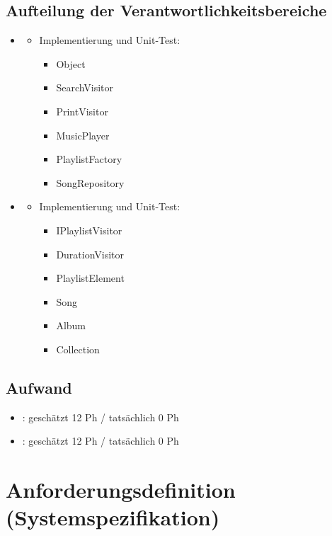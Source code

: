 \subsection{Aufteilung der Verantwortlichkeitsbereiche}
\begin{itemize}
	\item \docauthor
	\begin{itemize}
		\item Implementierung und Unit-Test:
		\begin{itemize}
			\item Object
			\item SearchVisitor
			\item PrintVisitor
			\item MusicPlayer
			\item PlaylistFactory
			\item SongRepository
		\end{itemize}
	\end{itemize}
	\item \doccoauthor
	\begin{itemize}
		\item Implementierung und Unit-Test:
		\begin{itemize}
			\item IPlaylistVisitor
			\item DurationVisitor
			\item PlaylistElement
			\item Song
			\item Album
			\item Collection
		\end{itemize}
	\end{itemize}	
\end{itemize}

\subsection{Aufwand}

\begin{itemize}
	\item \docauthor: geschätzt 12 Ph / tatsächlich 0 Ph
	\item \doccoauthor: geschätzt 12 Ph / tatsächlich 0 Ph
\end{itemize}

\section{Anforderungsdefinition (Systemspezifikation)}
 
